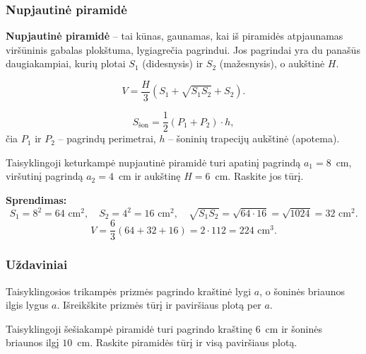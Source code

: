 \subsubsection*{Nupjautinė piramidė}

\begin{definition}
\textbf{Nupjautinė piramidė} -- tai kūnas, gaunamas, kai iš piramidės atpjaunamas viršūninis gabalas plokštuma, lygiagrečia pagrindui. Jos pagrindai yra du panašūs daugiakampiai, kurių plotai $S_1$ (didesnysis) ir $S_2$ (mažesnysis), o aukštinė $H$.
\end{definition}

\begin{theorem}
\[
V = \frac{H}{3}\left(S_1 + \sqrt{S_1 S_2} + S_2\right).
\]
\end{theorem}

\begin{theorem}
\[
S_{\text{šon}} = \frac{1}{2}(P_1 + P_2) \cdot h,
\]
čia $P_1$ ir $P_2$ -- pagrindų perimetrai, $h$ -- šoninių trapecijų aukštinė (apotema).
\end{theorem}

\begin{example}
Taisyklingoji keturkampė nupjautinė piramidė turi apatinį pagrindą $a_1 = 8$~cm, viršutinį pagrindą $a_2 = 4$~cm ir aukštinę $H = 6$~cm. Raskite jos tūrį.

\textbf{Sprendimas:}
\[
S_1 = 8^2 = 64 \text{ cm}^2, \quad S_2 = 4^2 = 16 \text{ cm}^2, \quad \sqrt{S_1 S_2} = \sqrt{64 \cdot 16} = \sqrt{1024} = 32 \text{ cm}^2.
\]
\[
V = \frac{6}{3}(64 + 32 + 16) = 2 \cdot 112 = 224 \text{ cm}^3.
\]
\end{example}

\subsubsection*{Uždaviniai}

\begin{exercise}
Taisyklingosios trikampės prizmės pagrindo kraštinė lygi $a$, o šoninės briaunos ilgis lygus $a$. Išreikškite prizmės tūrį ir paviršiaus plotą per $a$.
\end{exercise}

\begin{exercise}
Taisyklingoji šešiakampė piramidė turi pagrindo kraštinę $6$~cm ir šoninės briaunos ilgį $10$~cm. Raskite piramidės tūrį ir visą paviršiaus plotą.
\end{exercise}

